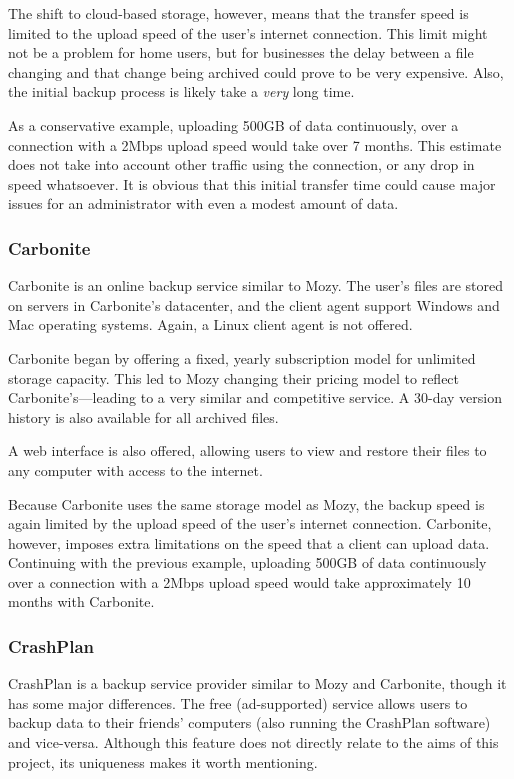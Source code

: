\begin{bibunit}[plain]
The shift to cloud-based storage, however, means that the transfer speed is
limited to the upload speed of the user's internet connection. This limit might
not be a problem for home users, but for businesses the delay between a file
changing and that change being archived could prove to be very expensive. Also,
the initial backup process is likely take a \emph{very} long time.

As a conservative example, uploading 500GB of data continuously, over
a connection with a 2Mbps upload speed would take over 7 months. This estimate
does not take into account other traffic using the connection, or any drop in
speed whatsoever. It is obvious that this initial transfer time could cause
major issues for an administrator with even a modest amount of data.

\subsubsection{Carbonite}

Carbonite is an online backup service similar to Mozy. The user's files are
stored on servers in Carbonite's datacenter, and the client agent support
Windows and Mac operating systems. Again, a Linux client agent is not
offered\cite{Carbonite}.

Carbonite began by offering a fixed, yearly subscription model for unlimited
storage capacity. This led to Mozy changing their pricing model to reflect
Carbonite's---leading to a very similar and competitive
service\cite{Carbonite-report}. A 30-day version history is also available for
all archived files\cite{Carbonite}.

A web interface is also offered, allowing users to view and restore their files
to any computer with access to the internet\cite{Carbonite}.

Because Carbonite uses the same storage model as Mozy, the backup speed is
again limited by the upload speed of the user's internet connection. Carbonite,
however, imposes extra limitations on the speed that a client can upload
data\cite{Carbonite-limits}. Continuing with the previous example, uploading
500GB of data continuously over a connection with a 2Mbps upload speed would
take approximately 10 months with Carbonite.


\subsubsection{CrashPlan}

CrashPlan is a backup service provider similar to Mozy and Carbonite, though it
has some major differences. The free (ad-supported) service allows users to
backup data to their friends' computers (also running the CrashPlan software)
and vice-versa. Although this feature does not directly relate to the aims of
this project, its uniqueness makes it worth mentioning.


\end{bibunit}
